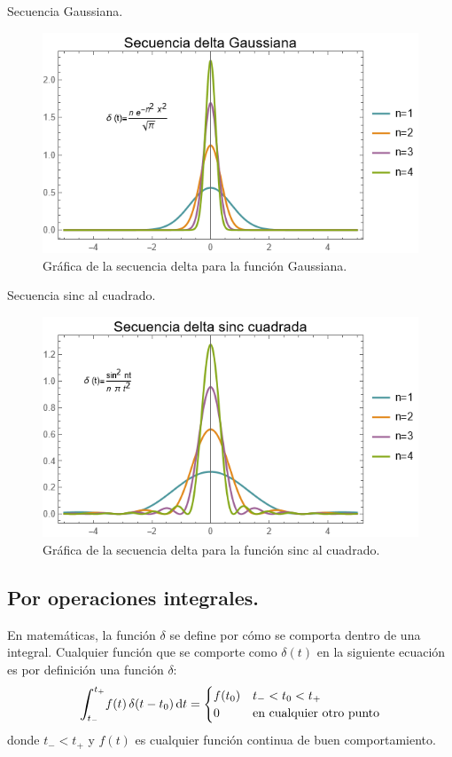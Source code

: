 \documentclass[12pt]{article}
\def\scaleint#1{\vcenter{\hbox{\scaleto[3ex]{\displaystyle\int}{#1}}}}
\def\bs{\mkern-12mu}
\numberwithin{equation}{section}
\begin{document}
Secuencia Gaussiana.
\begin{figure}[H]
    \centering
    \includegraphics[scale=1]{Imagenes/secuencia_Delta_06.png}
    \caption{Gráfica de la secuencia delta para la función Gaussiana.}
    \label{fig:figura_05_08}
\end{figure}

Secuencia sinc al cuadrado.
\begin{figure}[H]
    \centering
    \includegraphics[scale=1]{Imagenes/secuencia_Delta_07.png}
    \caption{Gráfica de la secuencia delta para la función sinc al cuadrado.}
    \label{fig:figura_05_09}
\end{figure}

\subsection{Por operaciones integrales.}

En matemáticas, la función $\delta$ se define por cómo se comporta dentro de una integral. Cualquier función que se comporte como $\delta (t)$ en la siguiente ecuación es por definición una función $\delta$:
\begin{align}
\scaleint{6ex}_{\bs t_{-}}^{t_{+}} f (t) \, \delta(t - t_{0}) \dd{t} = \begin{cases}
f (t_{0}) & t_{-} < t_{0}  < t_{+} \\
0 & \mbox{en cualquier otro punto}
\end{cases}
\label{eq:ecuacion_05_14}
\end{align}
donde $t_{-} < t_{+}$ y $f (t)$ es cualquier función continua de buen comportamiento.
\end{document}
